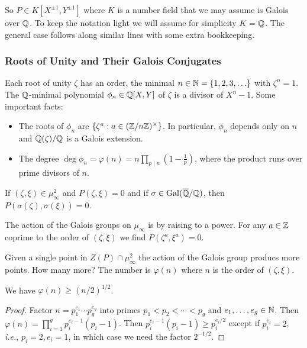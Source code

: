 So $P \in K[X^{\pm 1},Y^{\pm 1}]$ where $K$ is a number field that we may assume is
Galois over ${\mathbb{Q}}$. To keep the notation light we will assume for
simplicity $K={\mathbb{Q}}$. The general case follows along similar lines with
some extra bookkeeping.

\subsubsection{Roots of Unity and Their Galois Conjugates}

Each root of unity $\zeta$ has an order, the minimal
$n\in{\mathbb{N}}=\{1,2,3,\ldots\}$
with
$\zeta^n=1$. The ${\mathbb{Q}}$-minimal polynomial $\phi_n\in{\mathbb{Q}}[X,Y]$
of $\zeta$ is a divisor of
$X^n-1$. Some important facts:

\begin{itemize}
\item The roots of $\phi_n$ are $\{\zeta^a : a\in
  ({\mathbb{Z}}/n{\mathbb{Z}})^\times\}$. In particular, $\phi_n$ depends only on $n$
  and ${\mathbb{Q}}(\zeta)/{\mathbb{Q}}$ is a Galois extension. 
\item The degree $\deg \phi_n = \varphi(n)= n \prod_{p\mid n}
  \left(1-\frac 1p\right)$, where the product runs over prime divisors
  of $n$.
\end{itemize}

\begin{crucial}
  If $(\zeta,\xi)\in \mu_\infty^2$ and $P(\zeta,\xi)=0$ and if
  $\sigma\in \mathrm{Gal}({\overline{\mathbb{Q}}}/{\mathbb{Q}})$, then
  $P(\sigma(\zeta),\sigma(\xi))=0$.

  The action of the Galois groups on $\mu_\infty$ is by raising to a
  power. For any $a\in{\mathbb{Z}}$ coprime to the order of $(\zeta,\xi)$  
  we find $P(\zeta^a,\xi^a)=0$. 
\end{crucial}

Given a single point in $Z(P)\cap\mu_\infty^2$ the action of the
Galois group producs more points. How many more? The number is
$\varphi(n)$ where $n$ is the order of $(\zeta,\xi)$. 

\begin{lemma}
  We have $\varphi(n) \ge (n/2)^{1/2}$. 
\end{lemma}
\begin{proof}
  Factor $n=p_1^{e_1}\cdots p_g^{e_g}$ into primes $p_1<p_2<\cdots <
  p_g$ and $e_1,\ldots,e_g\in{\mathbb{N}}$. Then $\varphi(n) = \prod_{i=1}^g
  p_i^{e_i-1}(p_i-1)$. Then $p_i^{e_i-1}(p_i-1)\ge p_i^{e_i/2}$ except
  if $p_i^{e_i}=2$, \textit{i.e.}, $p_i=2,e_i=1$, in which case we
  need the factor $2^{-1/2}$. 
\end{proof}



